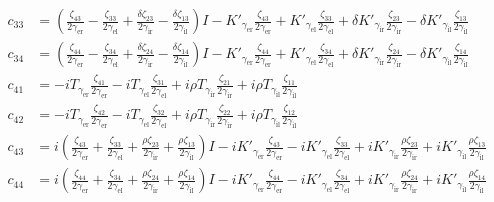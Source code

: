 \begin{align*}
  c_{33} &= \left(\frac{\zeta_{43}}{2 \gamma_\text{er}}-\frac{\zeta_{33}}{2 \gamma_\text{el}}+\frac{\delta \zeta_{23}}{2 \gamma_\text{ir}}-\frac{\delta \zeta_{13}}{2 \gamma_\text{il}}\right) I-K'_{\gamma_\text{er}} \frac{\zeta_{43}}{2 \gamma_\text{er}}+K'_{\gamma_\text{el}} \frac{\zeta_{33}}{2 \gamma_\text{el}}+\delta K'_{\gamma_\text{ir}} \frac{\zeta_{23}}{2 \gamma_\text{ir}}-\delta K'_{\gamma_\text{il}} \frac{\zeta_{13}}{2 \gamma_\text{il}} \\
  c_{34} &= \left(\frac{\zeta_{44}}{2 \gamma_\text{er}}-\frac{\zeta_{34}}{2 \gamma_\text{el}}+\frac{\delta \zeta_{24}}{2 \gamma_\text{ir}}-\frac{\delta \zeta_{14}}{2 \gamma_\text{il}}\right) I-K'_{\gamma_\text{er}} \frac{\zeta_{44}}{2 \gamma_\text{er}}+K'_{\gamma_\text{el}} \frac{\zeta_{34}}{2 \gamma_\text{el}}+\delta K'_{\gamma_\text{ir}} \frac{\zeta_{24}}{2 \gamma_\text{ir}}-\delta K'_{\gamma_\text{il}} \frac{\zeta_{14}}{2 \gamma_\text{il}} \\
  c_{41} &= -i T_{\gamma_\text{er}} \frac{\zeta_{41}}{2 \gamma_\text{er}}-i T_{\gamma_\text{el}} \frac{\zeta_{31}}{2 \gamma_\text{el}}+i \rho T_{\gamma_\text{ir}} \frac{\zeta_{21}}{2 \gamma_\text{ir}}+i \rho T_{\gamma_\text{il}} \frac{\zeta_{11}}{2 \gamma_\text{il}} \\
  c_{42} &= -i T_{\gamma_\text{er}} \frac{\zeta_{42}}{2 \gamma_\text{er}}-i T_{\gamma_\text{el}} \frac{\zeta_{32}}{2 \gamma_\text{el}}+i \rho T_{\gamma_\text{ir}} \frac{\zeta_{22}}{2 \gamma_\text{ir}}+i \rho T_{\gamma_\text{il}} \frac{\zeta_{12}}{2 \gamma_\text{il}} \\
  c_{43} &= i\left(\frac{\zeta_{43}}{2 \gamma_\text{er}}+ \frac{\zeta_{33}}{2 \gamma_\text{el}}+ \frac{\rho \zeta_{23}}{2 \gamma_\text{ir}}+\frac{\rho \zeta_{13}}{2 \gamma_\text{il}}\right) I-i K'_{\gamma_\text{er}} \frac{\zeta_{43}}{2 \gamma_\text{er}}-i K'_{\gamma_\text{el}} \frac{\zeta_{33}}{2 \gamma_\text{el}}+i K'_{\gamma_\text{ir}} \frac{\rho \zeta_{23}}{2 \gamma_\text{ir}}+i K'_{\gamma_\text{il}} \frac{\rho \zeta_{13}}{2 \gamma_\text{il}} \\
  c_{44} &= i\left(\frac{\zeta_{44}}{2 \gamma_\text{er}}+\frac{\zeta_{34}}{2 \gamma_\text{el}}+\frac{\rho \zeta_{24}}{2 \gamma_\text{ir}}+\frac{\rho \zeta_{14}}{2 \gamma_\text{il}}\right) I-i K'_{\gamma_\text{er}} \frac{\zeta_{44}}{2 \gamma_\text{er}}-i K'_{\gamma_\text{el}} \frac{\zeta_{34}}{2 \gamma_\text{el}}+i K'_{\gamma_\text{ir}} \frac{\rho \zeta_{24}}{2 \gamma_\text{ir}}+i K'_{\gamma_\text{il}} \frac{\rho \zeta_{14}}{2 \gamma_\text{il}} \\
\end{align*}
